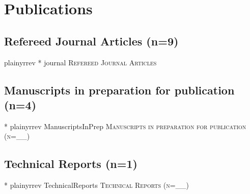 \documentclass[11pt,a4paper,sans]{moderncv} %
\begin{document}


\section{Publications}

\subsection{Refereed Journal Articles (n=9)}
{plainyrrev}
\nocite{journal}{*}
{journal}
{\large \textsc{Refereed Journal Articles}}


\subsection{Manuscripts in preparation for publication (n=4)}
\nocite{ManuscriptsInPrep}{*}
{plainyrrev}
{ManuscriptsInPrep}
{\large \textsc{Manuscripts in preparation for publication (n=__)}}

\subsection{Technical Reports (n=1)}
\nocite{TechnicalReports}{*}
{plainyrrev}
{TechnicalReports}
{\large \textsc{Technical Reports (n=__)}}
\end{document}
